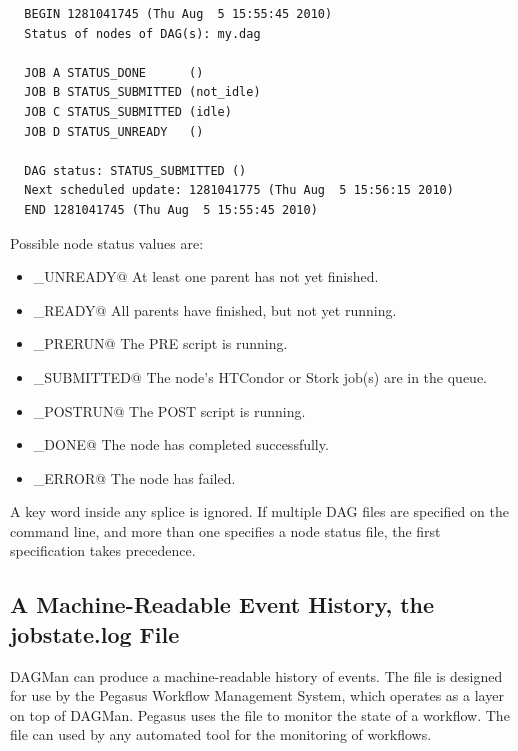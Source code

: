 \begin{verbatim}
  BEGIN 1281041745 (Thu Aug  5 15:55:45 2010)
  Status of nodes of DAG(s): my.dag

  JOB A STATUS_DONE      ()
  JOB B STATUS_SUBMITTED (not_idle)
  JOB C STATUS_SUBMITTED (idle)
  JOB D STATUS_UNREADY   ()

  DAG status: STATUS_SUBMITTED ()
  Next scheduled update: 1281041775 (Thu Aug  5 15:56:15 2010)
  END 1281041745 (Thu Aug  5 15:55:45 2010)
\end{verbatim}

Possible node status values are:

\begin{itemize}
\item \verb@STATUS_UNREADY@ At least one parent has not yet finished.
\item \verb@STATUS_READY@ All parents have finished, but not yet running.
\item \verb@STATUS_PRERUN@ The PRE script is running.
\item \verb@STATUS_SUBMITTED@ The node's HTCondor or Stork job(s) are in 
  the queue.
\item \verb@STATUS_POSTRUN@ The POST script is running.
\item \verb@STATUS_DONE@ The node has completed successfully.
\item \verb@STATUS_ERROR@ The node has failed.
\end{itemize}

A  key word inside any splice is ignored.
If multiple DAG files are specified on the  command line,
and more than one specifies a node status file,
the first specification takes precedence.

\subsection{\label{sec:DAGJobstateLog}A Machine-Readable Event History, the jobstate.log File}

DAGMan can produce a machine-readable history of events.
The  file is designed for use by the Pegasus Workflow
Management System, which operates as a layer on top of DAGMan.  Pegasus
uses the  file to monitor the state of a workflow.
The  file can used by any
automated tool for the monitoring of workflows.

